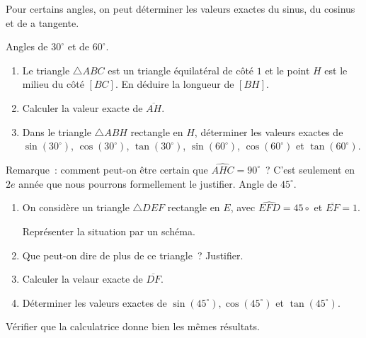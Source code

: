 \documentclass[a4paper,12pt]{article}
\begin{document}
\begin{activite}
	Pour certains angles, on peut déterminer les valeurs exactes du sinus, du cosinus et de a tangente. 

	\begin{tasks}
		\task Angles de $30^\circ$ et de $60^\circ$.

		\begin{minipage}[t]{0.6\textwidth}{
		\vspace{0pt}
		\begin{enumerate}
			\item Le triangle $\triangle ABC$ est un triangle équilatéral de côté $1$ et le point $H$ est le milieu du côté $[BC]$. En déduire la longueur de $[BH]$. 
			\item Calculer la valeur exacte de $\overline{AH}$. 
			\item Dans le triangle $\triangle ABH$ rectangle en $H$, déterminer les valeurs exactes de $\sin(30^\circ)$, $\cos(30^\circ)$, $\tan(30^\circ)$, $\sin(60^\circ)$, $\cos(60^\circ)$ et $\tan(60^\circ)$.
		\end{enumerate}
		}
		\end{minipage}
		\hfill
		\begin{minipage}[t]{0.25\textwidth}{
		\vspace{0pt}
		\begin{center}
		\end{center}
		}
		\end{minipage}
	
	Remarque~: comment peut-on être certain que $\widehat{AHC}=90^\circ$~? C'est seulement en $2e$ année que nous pourrons formellement le justifier. 	
\task Angle de $45^\circ$.

\begin{enumerate}
	\item On considère un triangle $\triangle DEF$ rectangle en $E$, avec $\widehat{EFD}=45\circ$ et $\overline{EF}=1$. 

		Représenter la situation par un schéma.
	\item Que peut-on dire de plus de ce triangle~? Justifier.
	\item Calculer la velaur exacte de $\overline{DF}$. 
	\item Déterminer les valeurs exactes de $\sin(45^\circ),\cos(45^\circ)$ et $\tan(45^\circ)$. 
\end{enumerate}
\task Vérifier que la calculatrice donne bien les mêmes résultats.
	\end{tasks}
\end{activite}
\end{document}
